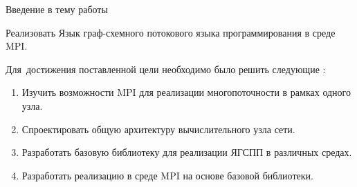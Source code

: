
{\actuality} Введение в тему работы

{\aim} Реализовать Язык граф-схемного потокового языка программирования в среде MPI.

Для~достижения поставленной цели необходимо было решить следующие {\tasks}:
\begin{enumerate}
  \item Изучить возможности MPI для реализации многопоточности в рамках одного узла.
  \item Спроектировать общую архитектуру вычислительного узла сети.
  \item Разработать базовую библиотеку для реализации ЯГСПП в различных средах.
  \item Разработать реализацию в среде MPI на основе базовой библиотеки.
\end{enumerate}
    

